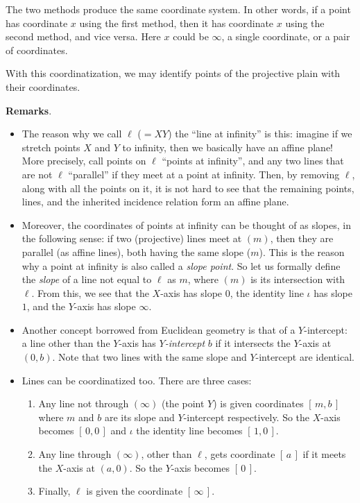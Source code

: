 \documentclass[12pt]{article}
\begin{document}
The two methods produce the same coordinate system.  In other words, if a point has coordinate $x$ using the first method, then it has coordinate $x$ using the second method, and vice versa.  Here $x$ could be $\infty$, a single coordinate, or a pair of coordinates.

With this coordinatization, we may identify points of the projective plain with their coordinates.

\textbf{Remarks}.
\begin{itemize}
\item The reason why we call $\ell$ ($=XY$) the ``line at infinity'' is this: imagine if we stretch points $X$ and $Y$ to infinity, then we basically have an affine plane!  More precisely, call points on $\ell$ ``points at infinity'', and any two lines that are not $\ell$ ``parallel'' if they meet at a point at infinity.  Then, by removing $\ell$, along with all the points on it, it is not hard to see that the remaining points, lines, and the inherited incidence relation form an affine plane.
\item Moreover, the coordinates of points at infinity can be thought of as slopes, in the following sense: if two (projective) lines meet at $(m)$, then they are parallel (as affine lines), both having the same slope ($m$).  This is the reason why a point at infinity is also called a \emph{slope point}.  So let us formally define the \emph{slope} of a line not equal to $\ell$ as $m$, where $(m)$ is its intersection with $\ell$.  From this, we see that the $X$-axis has slope $0$, the identity line $\iota$ has slope $1$, and the $Y$-axis has slope $\infty$.
\item Another concept borrowed from Euclidean geometry is that of a $Y$-intercept: a line other than the $Y$-axis has \emph{$Y$-intercept} $b$ if it intersects the $Y$-axis at $(0,b)$.  Note that two lines with the same slope and $Y$-intercept are identical.
\item Lines can be coordinatized too.  There are three cases:
\begin{enumerate}
\item Any line not through $(\infty)$ (the point $Y$) is given coordinates $[\,m,b\,]$ where $m$ and $b$ are its slope and $Y$-intercept respectively.  So the $X$-axis becomes $[\,0,0\,]$ and $\iota$ the identity line becomes $[\,1,0\,]$.  
\item Any line through $(\infty)$, other than $\ell$, gets coordinate $[\,a\,]$ if it meets the $X$-axis at $(a,0)$.  So the $Y$-axis becomes $[\,0\,]$.  
\item Finally, $\ell$ is given the coordinate $[\,\infty\,]$.

\end{enumerate}
\end{itemize}
\end{document}
